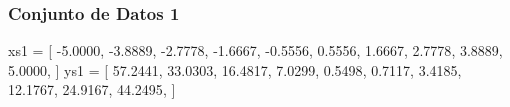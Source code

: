 \documentclass[
  letterpaper,
  DIV=11,
  numbers=noendperiod]{scrartcl}
\newenvironment{Shaded}{\begin{snugshade}}{\end{snugshade}}
\newcommand{\FloatTok}[1]{\textcolor[rgb]{0.68,0.00,0.00}{#1}}
\newcommand{\NormalTok}[1]{\textcolor[rgb]{0.00,0.23,0.31}{#1}}
\newcommand{\OperatorTok}[1]{\textcolor[rgb]{0.37,0.37,0.37}{#1}}
\begin{document}
\subsubsection{Conjunto de Datos 1}\label{conjunto-de-datos-1}

\begin{Shaded}
\begin{Highlighting}[]
\NormalTok{xs1 }\OperatorTok{=}\NormalTok{ [}
    \OperatorTok{{-}}\FloatTok{5.0000}\NormalTok{,}
    \OperatorTok{{-}}\FloatTok{3.8889}\NormalTok{,}
    \OperatorTok{{-}}\FloatTok{2.7778}\NormalTok{,}
    \OperatorTok{{-}}\FloatTok{1.6667}\NormalTok{,}
    \OperatorTok{{-}}\FloatTok{0.5556}\NormalTok{,}
    \FloatTok{0.5556}\NormalTok{,}
    \FloatTok{1.6667}\NormalTok{,}
    \FloatTok{2.7778}\NormalTok{,}
    \FloatTok{3.8889}\NormalTok{,}
    \FloatTok{5.0000}\NormalTok{,}
\NormalTok{]}
\NormalTok{ys1 }\OperatorTok{=}\NormalTok{ [}
    \FloatTok{57.2441}\NormalTok{,}
    \FloatTok{33.0303}\NormalTok{,}
    \FloatTok{16.4817}\NormalTok{,}
    \FloatTok{7.0299}\NormalTok{,}
    \FloatTok{0.5498}\NormalTok{,}
    \FloatTok{0.7117}\NormalTok{,}
    \FloatTok{3.4185}\NormalTok{,}
    \FloatTok{12.1767}\NormalTok{,}
    \FloatTok{24.9167}\NormalTok{,}
    \FloatTok{44.2495}\NormalTok{,}
\NormalTok{]}
\end{Highlighting}
\end{Shaded}
\end{document}
